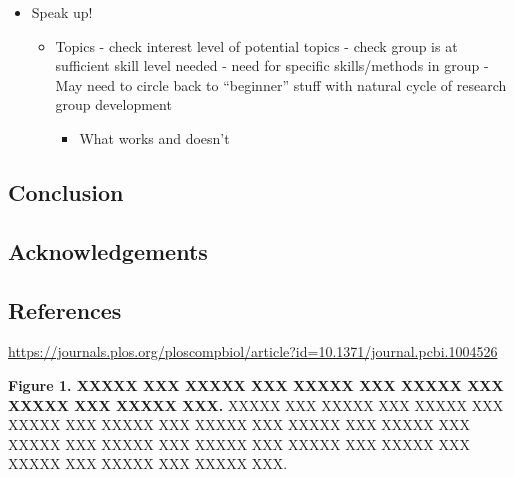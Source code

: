 \documentclass[
  11pt,
]{article}
\providecommand{\tightlist}{%
  \setlength{\itemsep}{0pt}\setlength{\parskip}{0pt}}
\begin{document}
\begin{itemize}
\tightlist
\item
  Speak up!

  \begin{itemize}
  \tightlist
  \item
    Topics - check interest level of potential topics - check group is
    at sufficient skill level needed - need for specific skills/methods
    in group - May need to circle back to ``beginner'' stuff with
    natural cycle of research group development

    \begin{itemize}
    \tightlist
    \item
      What works and doesn't
    \end{itemize}
  \end{itemize}
\end{itemize}

\hypertarget{conclusion}{%
\subsection{Conclusion}\label{conclusion}}

\hypertarget{acknowledgements}{%
\subsection{Acknowledgements}\label{acknowledgements}}

\newpage

\hypertarget{references}{%
\subsection{References}\label{references}}

\hypertarget{refs}{}

\url{https://journals.plos.org/ploscompbiol/article?id=10.1371/journal.pcbi.1004526}

\newpage

\textbf{Figure 1. XXXXX XXX XXXXX XXX XXXXX XXX XXXXX XXX XXXXX XXX
XXXXX XXX.} XXXXX XXX XXXXX XXX XXXXX XXX XXXXX XXX XXXXX XXX XXXXX XXX
XXXXX XXX XXXXX XXX XXXXX XXX XXXXX XXX XXXXX XXX XXXXX XXX XXXXX XXX
XXXXX XXX XXXXX XXX XXXXX XXX.
\end{document}
